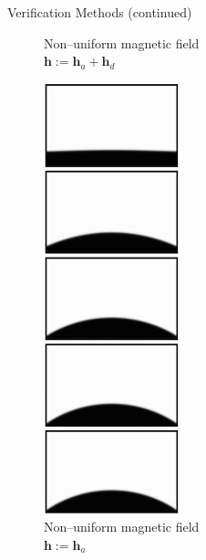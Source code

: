 \documentclass[9pt]{beamer}
\begin{document}
\begin{frame}{Verification Methods (continued)}
\begin{minipage}{.3\paperwidth}
\begin{figure}[!b]
			\caption*{Non--uniform magnetic field\\ \centering$\mathbf{h} := \mathbf{h}_a + \mathbf{h}_d$}
		\end{figure}
	\end{minipage}%
	\begin{minipage}{.3\paperwidth}
		\begin{figure}[!b]
			\centering
			\includegraphics[scale=.56]{Oval.jpg}
			\caption*{Non--uniform magnetic field\\ \centering$\mathbf{h} := \mathbf{h}_a$}
		\end{figure}
	\end{minipage}%
\end{frame}
\end{document}
